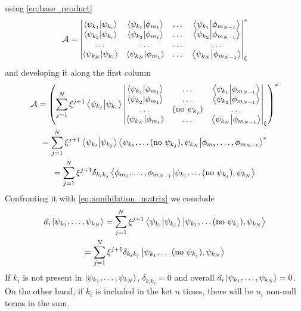 using \cref{eq:base_product}
\begin{equation}
    \mathcal{A} = \begin{vmatrix}
        \braket{\psi_{k_1}}{\psi_{k_i}} & \braket{\psi_{k_1}}{\phi_{m_1}} & \dots & \braket{\psi_{k_1}}{\phi_{m_{N-1}} } \\
        \braket{\psi_{k_2}}{\psi_{k_i}} & \braket{\psi_{k_2}}{\phi_{m_1}} & \dots & \braket{\psi_{k_2}}{\phi_{m_{N-1}}}  \\
        \dots                           & \dots                           & \dots & \dots                                \\
        \braket{\psi_{k_N}}{\psi_{k_i}} & \braket{\psi_{k_N}}{\phi_{m_1}} & \dots & \braket{\psi_{k_N}}{\phi_{m_{N-1}}}  \\
    \end{vmatrix}_\xi^*
\end{equation}
and developing it along the first column
\begin{multline}
    \mathcal{A} = \left( \sum_{j=1}^N \xi^{j+1} \braket{\psi_{k_j}}{\psi_{k_i}}
    \begin{vmatrix}
        \braket{\psi_{k_1}}{\phi_{m_1}} & \dots                   & \braket{\psi_{k_1}}{\phi_{m_{N-1}} } \\
        \braket{\psi_{k_2}}{\phi_{m_1}} & \dots                   & \braket{\psi_{k_2}}{\phi_{m_{N-1}}}  \\
        \dots                           & (\text{no } \psi_{k_j}) & \dots                                \\
        \braket{\psi_{k_N}}{\phi_{m_1}} & \dots                   & \braket{\psi_{k_N}}{\phi_{m_{N-1}}}  \\
    \end{vmatrix}_\xi
    \right)^*
    \\ = \sum_{j=1}^N \xi^{j+1} \braket{\psi_{k_i}}{\psi_{k_j}}  \bra{\psi_{k_1}, \dots (\text{no } \psi_{k_j}), \psi_{k_N}} \ket{\phi_{m_1}, \dots, \phi_{m_{N-1}}}^*
    \\ = \sum_{j=1}^N \xi^{j+1} \delta_{k_ik_j}  \bra{\phi_{m_1}, \dots, \phi_{m_{N-1}}} \ket{\psi_{k_1}, \dots (\text{no } \psi_{k_j}), \psi_{k_N}}
\end{multline}
Confronting it with \cref{eq:annihilation_matrix} we conclude
\begin{multline} \label{eq:annihilation_operator}
    \hat{a_i} \ket{\psi_{k_1}, \dots, \psi_{k_N}}
    = \sum_{j=1}^N \xi^{j+1} \braket{\psi_{k_i}}{\psi_{k_j}} \ket{\psi_{k_1}, \dots (\text{no } \psi_{k_j}), \psi_{k_N}}
    \\= \sum_{j=1}^N \xi^{j+1} \delta_{k_ik_j} \ket{\psi_{k_1}, \dots (\text{no } \psi_{k_j}), \psi_{k_N}}
\end{multline}
If $k_i$ is not present in $\ket{\psi_{k_1}, \dots, \psi_{k_N}}$, $\delta_{k_ik_j} = 0$ and overall $ \hat{a_i} \ket{\psi_{k_1}, \dots, \psi_{k_N}} = 0$. On the other hand, if $k_i$ is included in the ket $n$ times, there will be $n_i$ non-null terms in the sum.

